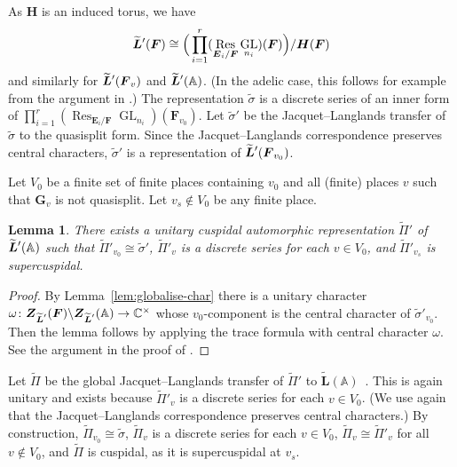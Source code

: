 \documentclass[a4paper]{amsart}
\numberwithin{equation}{section}
\newtheorem{lem}[thm]{Lemma}
\theoremstyle{remark}
\theoremstyle{definition}
\DeclareMathOperator{\Res}{Res}
\newcommand{\C}{\mathbb{C}}
\DeclareMathOperator{\GL}{GL}
\newcommand{\glob}[1]{\boldsymbol{#1}}
\renewcommand{\simeq}{\cong}
\newcommand{\lowprime}[1][\prime]{
  \mathchoice
    {\raisebox{-0.7ex}{$\scriptstyle #1$}}
    {\raisebox{-0.7ex}{$\scriptstyle #1$}}
    {\raisebox{-0.7ex}{$\scriptstyle #1$}}
    {\raisebox{-0.3ex}{$\scriptscriptstyle #1$}}
}
\begin{document}
As $\glob{H}$ is an induced torus, we have
\[\widetilde{\glob{L}}^{\lowprime}(\glob{F})\simeq \Big(\prod_{i = 1}^{r}(\Res_{\glob{E}_{i}/\glob{F}}\GL_{n_{i}})(\glob{F})\Big)/\glob{H}(\glob{F})\] and 
similarly for $\widetilde{\glob{L}}^{\lowprime}(\glob{F}_v)$ and $\widetilde{\glob{L}}^{\lowprime}(\mathbb{A})$. (In the adelic case, this follows for example from the argument in \cite[\S III.2.3]{MR762353}.)
The representation $\widetilde{\sigma}$ is a discrete series of an inner form of $\prod_{i = 1}^{r}(\Res_{\glob{E}_{i}/\glob{F}}\GL_{n_{i}})(\glob{F}_{v_{0}})$.
Let $\widetilde{\sigma}'$ be the Jacquet--Langlands transfer of $\widetilde{\sigma}$ to the quasisplit form.
Since the Jacquet--Langlands correspondence preserves central characters, $\widetilde{\sigma}'$ is a representation of $\widetilde{\glob{L}}^{\lowprime}(\glob{F}_{v_{0}})$.

Let $V_{0}$ be a finite set of finite places containing $v_0$ and all (finite) places $v$ such that $\glob{G}_{v}$ is not quasisplit.
Let $v_s \notin V_{0}$ be any finite place.

\begin{lem}
There exists a unitary cuspidal automorphic representation $\widetilde{\Pi}'$ of $\widetilde{\glob{L}}^{\lowprime}(\mathbb{A})$ such that $\widetilde{\Pi}'_{v_{0}}\simeq \widetilde{\sigma}'$, $\widetilde{\Pi}'_{v}$ is a discrete series for each $v\in V_{0}$, and $\widetilde{\Pi}'_{v_s}$ is supercuspidal.
\end{lem}
\begin{proof}
By Lemma~\ref{lem:globalise-char} there is a unitary character $\omega\colon \glob{Z}_{\widetilde{\glob{L}}^{\lowprime}}(\glob{F})\backslash\glob{Z}_{\widetilde{\glob{L}}^{\lowprime}}(\mathbb{A}) \to \C^\times$ whose $v_{0}$-component is the central character of $\widetilde{\sigma}'_{v_{0}}$.
Then the lemma follows by applying the trace formula with central character $\omega$.
See the argument in the proof of \cite[III.3~Proposition]{MR928510}.
\end{proof}

Let $\widetilde{\Pi}$ be the global Jacquet--Langlands transfer of $\widetilde{\Pi}'$ to $\widetilde{\glob{L}}(\mathbb{A})$~\cite[Theorem~5.1]{MR2390289}.
This is again unitary and exists because $\widetilde{\Pi}'_{v}$ is a discrete series for each $v\in V_{0}$.
(We use again that the Jacquet--Langlands correspondence preserves central characters.)
By construction, $\widetilde{\Pi}_{v_0} \cong \widetilde{\sigma}$, $\widetilde{\Pi}_{v}$ is a discrete series for each $v\in V_{0}$, $\widetilde{\Pi}_{v} \cong \widetilde{\Pi}'_{v}$ for all $v\notin V_0$, and $\widetilde{\Pi}$ is cuspidal, as it is supercuspidal at $v_s$.
\end{document}
